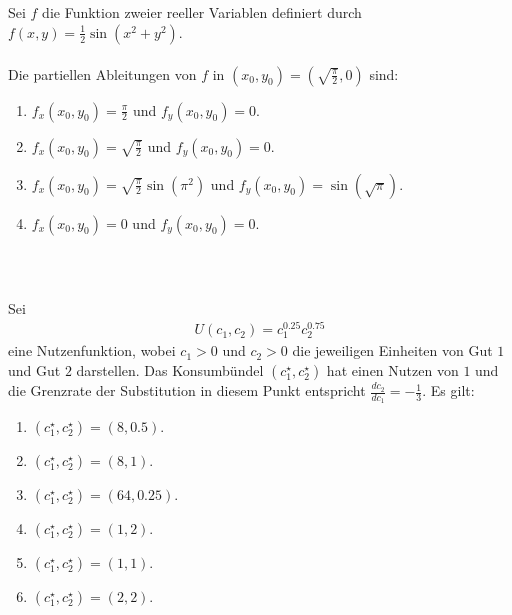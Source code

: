\subsection*{}
Sei $f$ die Funktion zweier reeller Variablen definiert durch $f(x,y) = \frac{1}{2} \sin(x^2 +y^2).$\\
\\
Die partiellen Ableitungen von $f$ in $(x_0, y_0) = \left(\sqrt{\frac{\pi}{2}}, 0 \right)$ sind:
\renewcommand{\labelenumi}{(\alph{enumi})}
\begin{enumerate}
\item 
$f_x(x_0,y_0) = \frac{\pi}{2}$ und $f_y(x_0,y_0) = 0$.
\item
$f_x(x_0,y_0) =  \sqrt{\frac{\pi}{2}} $ und $f_y(x_0,y_0) = 0$.
\item
$f_x(x_0,y_0) = \sqrt{\frac{\pi}{2}} \sin(\pi^2) $ und $f_y(x_0,y_0) = \sin(\sqrt{\pi})$.
\item
$f_x(x_0,y_0) = 0 $ und $f_y(x_0,y_0) = 0$.
\end{enumerate}
\ \\
\subsection*{}
Sei 
\begin{align*}
	U(c_1,c_2) = c_1^{0.25} c_2^{0.75}
\end{align*}
eine Nutzenfunktion, wobei $c_1 > 0$ und $c_2 > 0$ die jeweiligen Einheiten von Gut $1$ und Gut $2$ darstellen.
Das Konsumbündel $(c_1^\star, c_2^\star)$ hat einen Nutzen von $1$ und die Grenzrate der Substitution in diesem Punkt entspricht
$\frac{d c_2}{d c_1} = - \frac{1}{3}$.
Es gilt:
\renewcommand{\labelenumi}{(\alph{enumi})}
\begin{enumerate}
	\item 
	$ (c_1^\star,c_2^\star) = (8,0.5) $.
	\item
	$ (c_1^\star,c_2^\star) = (8,1) $.
	\item
	$ (c_1^\star,c_2^\star) = (64,0.25) $.
	\item
	$ (c_1^\star,c_2^\star) = (1,2) $.
	\item
	$ (c_1^\star,c_2^\star) = (1,1) $.
	\item
	$ (c_1^\star,c_2^\star) = (2,2) $.
\end{enumerate}
\ \\
